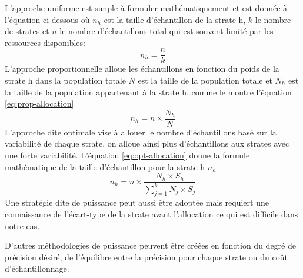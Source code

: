             L'approche uniforme est simple à formuler mathématiquement et est donnée à l'équation ci-dessous où $n_h$ est la taille d'échantillon de la strate h, $k$ le nombre de strates et $n$ le nombre d'échantillons total qui est souvent limité par les ressources disponibles:
            \begin{equation}
                n_h = \frac{n}{k}
            \end{equation}
            L'approche proportionnelle alloue les échantillons en fonction du poids de la strate h dans la population totale $N$ est la taille de la population totale et $N_h$ est la taille de la population appartenant à la strate h, comme le montre l'équation \ref{eq:prop-allocation}
            \begin{equation}
                n_h = n \times \frac{N_h}{N} \label{eq:prop-allocation}
            \end{equation}
            L'approche dite optimale vise à allouer le nombre d'échantillons basé sur la variabilité de chaque strate, on alloue ainsi plus d'échantillons aux strates avec une forte variabilité. L'équation
            \ref{eq:opt-allocation} donne la formule mathématique de la taille d'échantillon pour la strate h $n_h$
            \begin{equation}
                n_h = n \times \frac{N_h \times S_h}{\sum_{j=1}^{k} N_j\times S_j} \label{eq:opt-allocation}
            \end{equation}
            Une stratégie dite de puissance peut aussi être adoptée mais requiert une connaissance de l'écart-type de la strate avant l'allocation ce qui est difficile dans notre cas.\par
            D'autres méthodologies de puissance peuvent être créées en fonction du degré de précision désiré, de l'équilibre entre la précision pour chaque strate ou du coût d'échantillonnage. 
